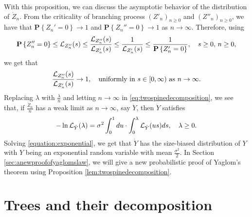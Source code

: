 \documentclass[12pt]{amsart}
\numberwithin{equation}{section}
\newcommand{\prob}{\mathbf P}
\newcommand{\set}[1]{\left\{ #1 \right\}}
\newcommand{\uniformly}{\text{uniformly in }}
\begin{document}
\par
	With this proposition, we can discuss the asymptotic behavior of the distribution of $\dot Z_n$.
	From the criticality of branching process $(Z'_n)_{n\ge 0}$ and $(Z''_n)_{n\ge 0}$, we have that $\prob\set{Z_n'=0}\to 1$ and $\prob\set{Z_n''=0}\to 1$ as $n\to\infty$.
	Therefore, using
\begin{equation*}
		\prob\set{Z_n''=0}
	\leq
		\cL_{Z_n''}(s)
	\leq
		\frac{\cL_{Z_n''}(s)}{\cL_{Z_n'}(s)}
	\leq
		\frac{1}{\cL_{Z_n'}(s)}
	\leq
		\frac{1}{\prob \set{Z_n'=0}},
	\quad
		s\geq 0,\, n\ge 0,
\end{equation*}
	we get that
\begin{equation}
\label{eq:uniformly}
	    \frac{\cL_{Z_n''}(s)}{\cL_{Z_n'}(s)}
	\to
	    1,
	\quad
		\uniformly s\in [0,\infty)\text{ as } n\to\infty.
\end{equation}
	Replacing $\lambda$ with $\frac{\lambda}{n}$ and letting $n\to\infty$ in \eqref{eq:twospinedecomposition}, we see that, if $\frac{\dot Z_n}{n}$ has a weak limit as $n\to\infty$, say $\dot Y$, then $\dot Y$ satisfies
\begin{equation}
\label{equation:exponential}
		-\ln \mathcal L_{\dot Y}(\lambda)
	=
		\sigma^2\int_0^1du\cdot\int_0^\lambda \mathcal L_{\dot Y}(us)ds,
	\quad\lambda \geq 0.
\end{equation}
	Solving \eqref{equation:exponential}, we get that $\dot Y$ has the size-biased distribution of $Y$ with $Y$ being an exponential random variable with mean $\frac{\sigma^2}{2}$.
	In Section \ref{sec:anewproofofyaglomslaw}, we will give a new probabilistic proof of Yaglom's theorem using Proposition \ref{lem:twospinedecomposition}.
\section{Trees and their decomposition}
\label{sec:preliminary}
\end{document}
